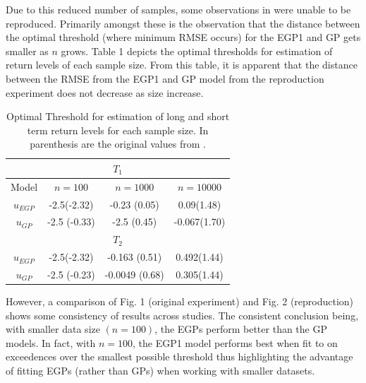\documentclass[12pt]{article}
\theoremstyle{definition}
\theoremstyle{definition}
\begin{document}
Due to this reduced number of samples, some observations in \cite{papatawn} were unable to be reproduced. Primarily amongst these is the observation that the distance between the optimal threshold (where minimum RMSE occurs) for the EGP1 and GP gets smaller as $n$ grows. Table 1 depicts the optimal thresholds for estimation of return levels of each sample size. From this table, it is apparent that the distance between the RMSE from the EGP1 and GP model from the reproduction experiment does not decrease as size increase.

\begin{table}[H]
    \centering
    \begin{tabular}{||c|c|c|c||}\hline
\multicolumn{4}{||c||}{$T_1$}\\\hline\hline
    Model& $n=100$& $n=1000$& $n=10000$\\\hline
    $u_{EGP}$ & -2.5(-2.32)& -0.23 (0.05) & 0.09(1.48)  \\
     $u_{GP}$& -2.5 (-0.33) & -2.5 (0.45) & -0.067(1.70)\\\hline\hline
     \multicolumn{4}{||c||}{$T_2$}\\\hline\hline
     $u_{EGP}$ & -2.5(-2.32)& -0.163 (0.51) & 0.492(1.44)  \\
     $u_{GP}$& -2.5 (-0.23) & -0.0049 (0.68) & 0.305(1.44)\\\hline
\end{tabular}
    \caption{Optimal Threshold for estimation of long and short term return levels for each sample size. In parenthesis are the original values from \cite{papatawn}. }
\end{table}

However, a comparison of Fig. 1 (original experiment) and Fig. 2 (reproduction) shows some consistency of results across studies. The consistent conclusion being, with smaller data size $(n=100)$, the EGPs perform better than the GP models. In fact, with $n=100$, the EGP1 model performs best when fit to on exceedences over the smallest possible threshold thus highlighting the advantage of fitting EGPs (rather than GPs) when working with smaller datasets.
\end{document}
